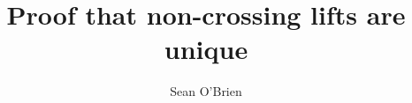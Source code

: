 \documentclass{amsart}
\begin{document}
\title{Proof that non-crossing lifts are unique}


\author{Sean O'Brien}
\address{}
\curraddr{}


%
%
%

% 

\maketitle






\end{document}
